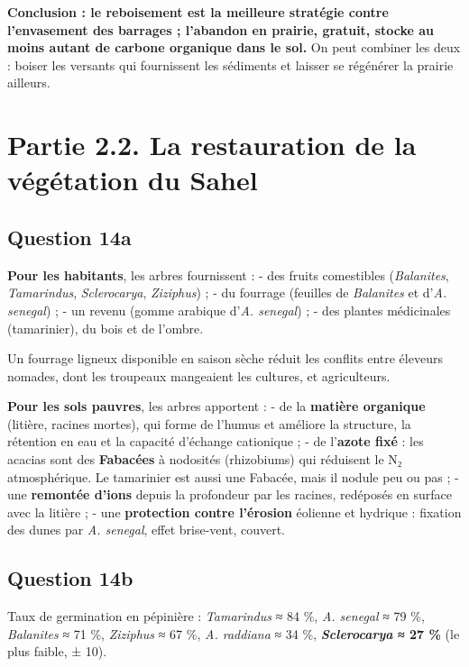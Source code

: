 \documentclass[11pt,a4paper]{article}
\begin{document}
\textbf{Conclusion : le reboisement est la meilleure stratégie contre l'envasement des barrages ; l'abandon en prairie, gratuit, stocke au moins autant de carbone organique dans le sol.} On peut combiner les deux : boiser les versants qui fournissent les sédiments et laisser se régénérer la prairie ailleurs.

\hypertarget{partie-2.2.-la-restauration-de-la-vuxe9guxe9tation-du-sahel}{%
\section{Partie 2.2. La restauration de la végétation du Sahel}\label{partie-2.2.-la-restauration-de-la-vuxe9guxe9tation-du-sahel}}

\hypertarget{question-14a}{%
\subsection{Question 14a}\label{question-14a}}

\textbf{Pour les habitants}, les arbres fournissent :
- des fruits comestibles (\emph{Balanites}, \emph{Tamarindus}, \emph{Sclerocarya}, \emph{Ziziphus}) ;
- du fourrage (feuilles de \emph{Balanites} et d'\emph{A. senegal}) ;
- un revenu (gomme arabique d'\emph{A. senegal}) ;
- des plantes médicinales (tamarinier), du bois et de l'ombre.

Un fourrage ligneux disponible en saison sèche réduit les conflits entre éleveurs nomades, dont les troupeaux mangeaient les cultures, et agriculteurs.

\textbf{Pour les sols pauvres}, les arbres apportent :
- de la \textbf{matière organique} (litière, racines mortes), qui forme de l'humus et améliore la structure, la rétention en eau et la capacité d'échange cationique ;
- de l'\textbf{azote fixé} : les acacias sont des \textbf{Fabacées} à nodosités (rhizobiums) qui réduisent le N₂ atmosphérique. Le tamarinier est aussi une Fabacée, mais il nodule peu ou pas ;
- une \textbf{remontée d'ions} depuis la profondeur par les racines, redéposés en surface avec la litière ;
- une \textbf{protection contre l'érosion} éolienne et hydrique : fixation des dunes par \emph{A. senegal}, effet brise-vent, couvert.

\hypertarget{question-14b}{%
\subsection{Question 14b}\label{question-14b}}

Taux de germination en pépinière : \emph{Tamarindus} ≈ 84 \%, \emph{A. senegal} ≈ 79 \%, \emph{Balanites} ≈ 71 \%, \emph{Ziziphus} ≈ 67 \%, \emph{A. raddiana} ≈ 34 \%, \textbf{\emph{Sclerocarya} ≈ 27 \%} (le plus faible, ± 10).
\end{document}
